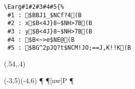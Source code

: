 \begin{boxnote}
\begin{verbatim}
\Earg#1#2#3#4#5{%
 #1 : $BBJ1_$NCf?4(B
 #2 : x$B<4J}8~$NH>7B(B
 #3 : y$B<4J}8~$NH>7B(B
 #4 : $B<~>e$NE@(B
 #5 : $BG^2pJQ?t$NCM!JO;==J,K!!K(B
\end{verbatim}
\end{boxnote}
\bigskip

\begin{showEx}(.54,.4){}
\begin{zahyou*}[ul=5mm](-3,5)(-4,6)
  \DaenniSessen{}\A\P\Q
  \Put\P[nw]{P}\Put{}
  \kuromaru{\P;\Q}
  \Earg{}\P\argP
  \Earg{}\Q\argQ
  \Put{}
  \Add{}\argQQ
  \Put{}
  \Drawline{\P\A\Q}
\end{zahyou*}
\end{showEx}

